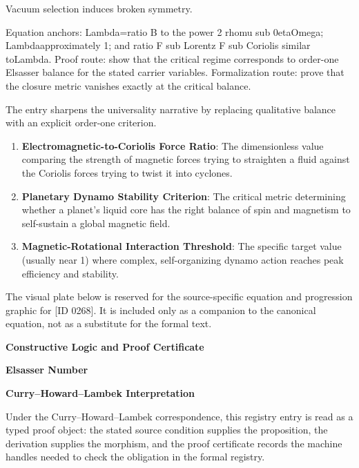 Vacuum selection induces broken symmetry.

Equation anchors: Lambda=ratio B to the power 2 rhomu sub 0etaOmega; Lambdaapproximately 1; and ratio F sub Lorentz F sub Coriolis similar toLambda. Proof route: show that the critical regime corresponds to order-one Elsasser balance for the stated carrier variables. Formalization route: prove that the closure metric vanishes exactly at the critical balance.

The entry sharpens the universality narrative by replacing qualitative balance with an explicit order-one criterion.
\endgroup

\begin{enumerate}[leftmargin=1.6em,itemsep=6pt,topsep=4pt]
\item \textbf{Electromagnetic-to-Coriolis Force Ratio}: The dimensionless value comparing the strength of magnetic forces trying to straighten a fluid against the Coriolis forces trying to twist it into cyclones.
\item \textbf{Planetary Dynamo Stability Criterion}: The critical metric determining whether a planet's liquid core has the right balance of spin and magnetism to self-sustain a global magnetic field.
\item \textbf{Magnetic-Rotational Interaction Threshold}: The specific target value (usually near 1) where complex, self-organizing dynamo action reaches peak efficiency and stability.
\end{enumerate}

\begingroup\footnotesize\sloppy
The visual plate below is reserved for the source-specific equation and progression graphic for [ID 0268]. It is included only as a companion to the canonical equation, not as a substitute for the formal text.
\par\endgroup
\ifTZPDarkEdition
{}
\fi

\clearpage
\begingroup\tzpsupportsetup
\noindent\textbf{\fontsize{10.8pt}{12.8pt}\selectfont [ID 0268] Constructive Logic and Proof Certificate}\par
\noindent\textbf{\fontsize{10pt}{12pt}\selectfont Elsasser Number}\par
\vspace{0.45em}
\begingroup
\footnotesize
\setlength{\parskip}{0.22em}
\setlength{\parindent}{0pt}
\noindent\textbf{Curry--Howard--Lambek Interpretation}\par
Under the Curry--Howard--Lambek correspondence, this registry entry is read as a typed proof
object: the stated source condition supplies the proposition, the derivation supplies the
morphism, and the proof certificate records the machine handles needed to check the obligation
in the formal registry.

